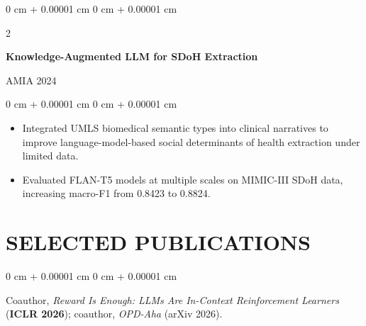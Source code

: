 \documentclass[10pt, letterpaper]{article}
\newenvironment{highlights}{
    \begin{itemize}[
        topsep=0.03 cm,
        parsep=0.03 cm,
        partopsep=0pt,
        itemsep=0pt,
        leftmargin=0 cm + 10pt
    ]
}{
    \end{itemize}
} %
\newenvironment{onecolentry}{
    \begin{adjustwidth}{
        0 cm + 0.00001 cm
    }{
        0 cm + 0.00001 cm
    }
}{
    \end{adjustwidth}
} %
\newenvironment{twocolentry}[2][]{
    \onecolentry
    \def\secondColumn{#2}
    \setcolumnwidth{\fill, 4.5 cm}
    \begin{paracol}{2}
}{
    \switchcolumn \raggedleft \secondColumn
    \end{paracol}
    \endonecolentry
} %
\begin{document}
\begin{twocolentry}{AMIA 2024}
\textbf{Knowledge-Augmented LLM for SDoH Extraction}
\end{twocolentry}
\begin{onecolentry}
\begin{highlights}
\item Integrated UMLS biomedical semantic types into clinical narratives to improve language-model-based social determinants of health extraction under limited data.
\item Evaluated FLAN-T5 models at multiple scales on MIMIC-III SDoH data, increasing macro-F1 from 0.8423 to 0.8824.
\end{highlights}
\end{onecolentry}
\vspace{0.06 cm}
\section{SELECTED PUBLICATIONS}
\begin{onecolentry}
Coauthor, \textit{Reward Is Enough: LLMs Are In-Context Reinforcement Learners} (\textbf{ICLR 2026}); coauthor, \textit{OPD-Aha} (arXiv 2026).
\end{onecolentry}
\end{document}
